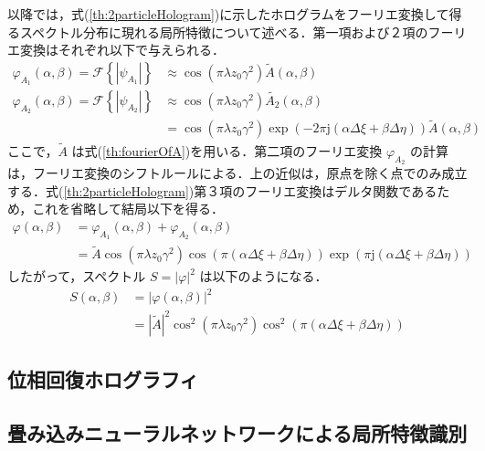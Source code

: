 以降では，式(\ref{th:2particleHologram})に示したホログラムをフーリエ変換して得るスペクトル分布に現れる局所特徴について述べる．第一項および２項のフーリエ変換はそれぞれ以下で与えられる\cite{doubleexposure}．
\begin{align}
    \label{th:particle1Fourier}
    \varphi_{A_1}(\alpha,\beta)  = \mathcal{F}\left\{\left| \psi_{A_1} \right|\right\}  &\approx \cos{ \left( \pi \lambda z_0 \gamma^2 \right) }\tilde{A}(\alpha,\beta)  \\
    \label{th:particle2Fourier}
    \varphi_{A_2}(\alpha,\beta) = \mathcal{F}\left\{\left| \psi_{A_2} \right|\right\}   &\approx \cos{ \left( \pi \lambda z_0 \gamma^2 \right) }\tilde{A_2}(\alpha,\beta) \\
    &=\cos{ \left( \pi \lambda z_0 \gamma^2 \right) } \exp{\left( -2\pi \mathrm{j}\left( \alpha \Delta \xi + \beta \Delta \eta \right) \right)} \tilde{A}(\alpha,\beta)
\end{align}
ここで，$\tilde{A}$ は式(\ref{th:fourierOfA})を用いる．第二項のフーリエ変換 $\varphi_{A_2}$ の計算は，フーリエ変換のシフトルールによる．上の近似は，原点を除く点でのみ成立する．式(\ref{th:2particleHologram})第３項のフーリエ変換はデルタ関数であるため，これを省略して結局以下を得る．
\begin{align}
    \varphi(\alpha,\beta) &= \varphi_{A_1}(\alpha,\beta) + \varphi_{A_2}(\alpha,\beta) \\
    &= \tilde{A} \cos{\left( \pi \lambda z_0 \gamma^2 \right)} \cos{\left( \pi \left( \alpha \Delta \xi + \beta \Delta \eta \right) \right)} \exp{\left( \pi \mathrm{j} \left( \alpha \Delta \xi + \beta \Delta \eta \right) \right)}
\end{align}
したがって，スペクトル $S = |\varphi|^2$ は以下のようになる．
\begin{align}
    S(\alpha,\beta) &= \left| \varphi(\alpha,\beta) \right|^2 \\
    \label{th:2particleSpectrum}
    &= \left| \tilde{A} \right|^2 \cos^2{\left( \pi \lambda z_0 \gamma^2 \right)} \cos^2{\left( \pi \left( \alpha \Delta \xi + \beta \Delta \eta \right) \right)}
\end{align}









\subsection{位相回復ホログラフィ}


\subsection{畳み込みニューラルネットワークによる局所特徴識別}



